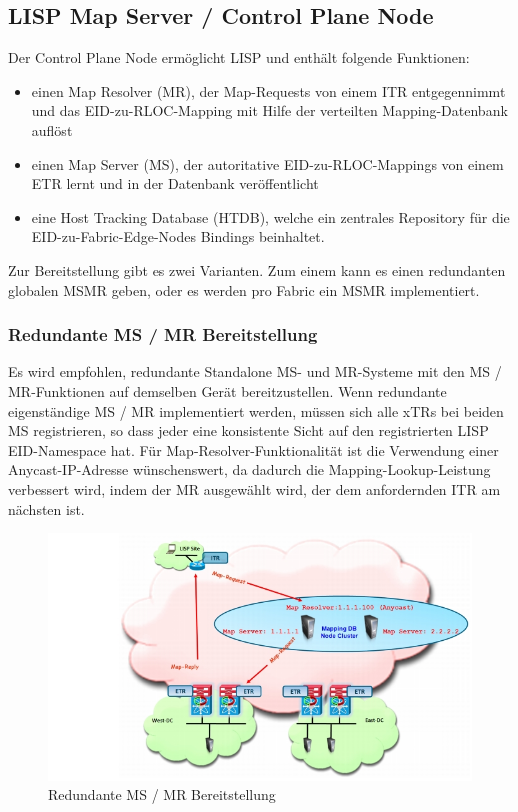 \subsection{LISP Map Server / Control Plane Node}
Der Control Plane Node ermöglicht LISP und enthält folgende Funktionen:
\begin{itemize}
	\item einen Map Resolver (MR), der Map-Requests von einem ITR entgegennimmt und das EID-zu-RLOC-Mapping mit Hilfe der verteilten Mapping-Datenbank auflöst
	\item einen Map Server (MS), der autoritative EID-zu-RLOC-Mappings von einem ETR lernt und in der Datenbank veröffentlicht
	\item eine Host Tracking Database (HTDB), welche ein zentrales Repository für die EID-zu-Fabric-Edge-Nodes Bindings beinhaltet.
\end{itemize}

Zur Bereitstellung gibt es zwei Varianten. Zum einem kann es einen redundanten globalen MSMR geben, oder es werden pro Fabric ein MSMR implementiert.

\subsubsection{Redundante MS / MR Bereitstellung}

Es wird empfohlen, redundante Standalone MS- und MR-Systeme mit den MS / MR-Funktionen auf demselben Gerät bereitzustellen. Wenn redundante eigenständige MS / MR implementiert werden, müssen sich alle xTRs bei beiden MS registrieren, so dass jeder eine konsistente Sicht auf den registrierten LISP EID-Namespace hat. Für Map-Resolver-Funktionalität ist die Verwendung einer Anycast-IP-Adresse wünschenswert, da dadurch die Mapping-Lookup-Leistung verbessert wird, indem der MR ausgewählt wird, der dem anfordernden ITR am nächsten ist.

\begin{figure}[H]
	\centering
	\includegraphics[width=1\linewidth]{img/Absicherung/LISP-Example}
	\caption{Redundante MS / MR Bereitstellung \cite{LISP-mobility} }
	\label{fig:Redundante MS / MR Bereitstellung}
\end{figure}

